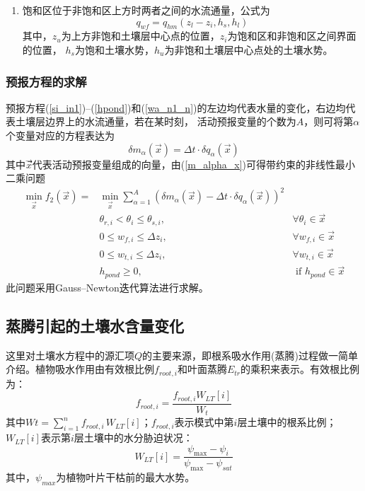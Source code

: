 \begin{enumerate}
    \item 饱和区位于非饱和区上方时两者之间的水流通量，公式为
    \begin{equation}
    q_{w f}=q_{h m}\left(z_{l}-z_{i}, h_{s}, h_{l}\right)
    \end{equation}
    其中，$z_u$为上方非饱和土壤层中心点的位置，$z_i$为饱和区和非饱和区之间界面的位置，
    $h_s$为饱和土壤水势，$h_u$为非饱和土壤层中心点处的土壤水势。
\end{enumerate}


\subsubsection{预报方程的求解}
预报方程(\ref{si_in1})--(\ref{hpond})和(\ref{wa_n1_n})的左边均代表水量的变化，右边均代表土壤层边界上的水流通量，若在某时刻，
活动预报变量的个数为$A$，则可将第$\alpha$个变量对应的方程表达为
\begin{equation}\label{m_alpha_x}
\delta m_{\alpha}(\vec{x})=\Delta t \cdot \delta q_{\alpha}(\vec{x})
\end{equation}
其中$\vec{x}$⃗代表活动预报变量组成的向量，由(\ref{m_alpha_x})可得带约束的非线性最小二乘问题
\begin{equation}
\begin{aligned}
\min _{\vec{x}} f_{2}(\vec{x})=& \min _{\vec{x}} \sum_{\alpha=1}^{A}\left(\delta m_{\alpha}(\vec{x})-\Delta t \cdot \delta q_{\alpha}(\vec{x})\right)^{2} \\ 
& \theta_{r, i}<\theta_{i} \leq \theta_{s, i}, & \forall \theta_{i} \in \vec{x} \\ 
& 0 \leq w_{f, i} \leq \Delta z_{i},               & \forall w_{f, i} \in \vec{x} \\ 
& 0 \leq w_{t, i} \leq \Delta z_{i},               & \forall w_{t, i} \in \vec{x} \\ 
& h_{ {pond }} \geq 0,                               & \text{ if } h_{ {pond }} \in \vec{x} 
\end{aligned}
\end{equation}
此问题采用Gauss--Newton迭代算法进行求解。

\subsection{蒸腾引起的土壤水含量变化}

这里对土壤水方程中的源汇项$Q$的主要来源，即根系吸水作用(蒸腾)过程做一简单介绍。植物吸水作用由有效根比例$f_{root,i}$和叶面蒸腾$E_{tr}$的乘积来表示\citep{dai2003common}。有效根比例为：
\begin{equation}
{f}_{ {root }, {i}}=\frac{{f}_{{root}, {i}} {W}_{{LT}}[{i}]}{W_{t}}
\end{equation}
其中$Wt = \sum_{i=1}^{n}{f_{root,i\ }W_{LT}\left[i\right]}$；$f_{root,i}$表示模式中第$i$层土壤中的根系比例；$W_{LT}[i]$表示第$i$层土壤中的水分胁迫状况：
\begin{equation}
{W}_{{LT}}[{i}]=\frac{\psi_{\max }-\psi_{i}}{\psi_{\max }-\psi_{sat}}
\end{equation}
其中，$\psi_{max}$为植物叶片干枯前的最大水势。

